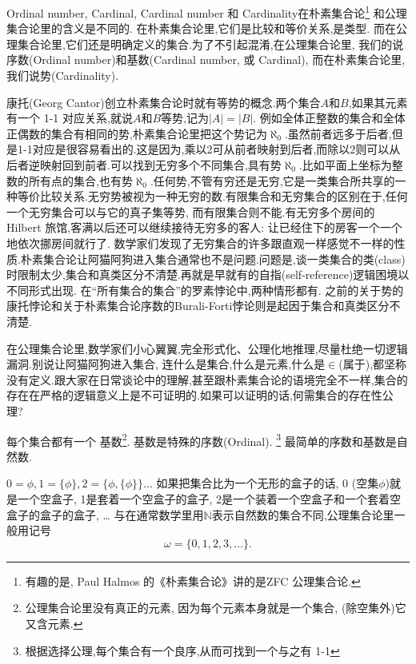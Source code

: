 \documentclass[main.tex]{subfiles}
\begin{document}
Ordinal number, Cardinal, Cardinal number 和 Cardinality在朴素集合论\footnote{有趣的是, Paul Halmos 的《朴素集合论》\cite{HalmosP}讲的是ZFC 公理集合论.}
和公理集合论里的含义是不同的. 
在朴素集合论里,它们是比较和等价关系,是类型.
而在公理集合论里,它们还是明确定义的集合.为了不引起混淆,在公理集合论里,
我们的说序数(Ordinal number)和基数(Cardinal number, 或 Cardinal),
而在朴素集合论里,我们说势(Cardinality).

康托(Georg Cantor)创立朴素集合论时就有等势的概念.两个集合$A$和$B$,如果其元素有一个 1-1 对应关系,就说$A$和$B$等势,记为$|A|=|B|$.
例如全体正整数的集合和全体正偶数的集合有相同的势,朴素集合论里把这个势记为$\aleph_0$.虽然前者远多于后者,但是1-1对应是很容易看出的.这是因为,乘以2可从前者映射到后者,而除以2则可以从后者逆映射回到前者.可以找到无穷多个不同集合,具有势$\aleph_0$.比如平面上坐标为整数的所有点的集合,也有势$\aleph_0$.任何势,不管有穷还是无穷,它是一类集合所共享的一种等价比较关系.无穷势被视为一种无穷的数.有限集合和无穷集合的区别在于,任何一个无穷集合可以与它的真子集等势, 而有限集合则不能.有无穷多个房间的Hilbert 旅馆,客满以后还可以继续接待无穷多的客人: 让已经住下的房客一个一个地依次挪房间就行了.
数学家们发现了无穷集合的许多跟直观一样感觉不一样的性质.朴素集合论让阿猫阿狗进入集合通常也不是问题.问题是,谈一类集合的类(class)时限制太少,集合和真类区分不清楚.再就是早就有的自指(self-reference)逻辑困境以不同形式出现.
在“所有集合的集合”的罗素悖论中,两种情形都有.
之前的关于势的康托悖论和关于朴素集合论序数的Burali-Forti悖论则是起因于集合和真类区分不清楚.

在公理集合论里,数学家们小心翼翼,完全形式化、公理化地推理,尽量杜绝一切逻辑漏洞.别说让阿猫阿狗进入集合, 连什么是集合,什么是元素,什么是$\in$(属于),都坚称没有定义.跟大家在日常谈论中的理解,甚至跟朴素集合论的语境完全不一样,集合的存在在严格的逻辑意义上是不可证明的.如果可以证明的话,何需集合的存在性公理?

每个集合都有一个
基数\footnote{公理集合论里没有真正的元素,
	因为每个元素本身就是一个集合, (除空集外)它又含元素.}. 
基数是特殊的序数(Ordinal).
\footnote{根据选择公理,每个集合有一个良序,从而可找到一个与之有 1-1 }
最简单的序数和基数是自然数.

$0 = \phi, 1 = \{\phi\}, 2 = \{\phi, \{\phi\}\}\dots$
如果把集合比为一个无形的盒子的话, 0 (空集$\phi$)就是一个空盒子, 1是套着一个空盒子的盒子,
2是一个装着一个空盒子和一个套着空盒子的盒子的盒子, \dots
与在通常数学里用$\mathbb{N}$表示自然数的集合不同,公理集合论里一般用记号
$$\omega = \{0, 1, 2, 3, \dots\}.$$
\end{document}
